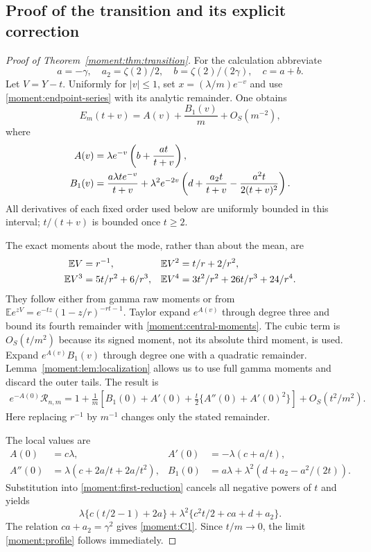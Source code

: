 \subsection{Proof of the transition and its explicit correction}
\begin{proof}[Proof of Theorem~\ref{moment:thm:transition}]
For the calculation abbreviate
\[
 a=-\gamma,\quad a_2=\zeta(2)/2,\quad b=\zeta(2)/(2\gamma),
 \quad c=a+b.
\]
Let $V=Y-t$. Uniformly for $|v|\le1$, set
$x=(\lambda/m)e^{-v}$ and use \eqref{moment:endpoint-series} with its
analytic remainder. One obtains
\begin{equation}\label{moment:local-expansion}
 E_m(t+v)=A(v)+\frac{B_1(v)}m+O_S(m^{-2}),
\end{equation}
where
\begin{align}\label{moment:local-functions}
 A(v)&=\lambda e^{-v}\left(b+\frac{at}{t+v}\right),\notag\\
 B_1(v)&=\frac{a\lambda te^{-v}}{t+v}
 +\lambda^2e^{-2v}\left(d+\frac{a_2t}{t+v}
                            -\frac{a^2t}{2(t+v)^2}\right).
\end{align}
All derivatives of each fixed order used below are uniformly bounded
in this interval; $t/(t+v)$ is bounded once $t\ge2$.

The exact moments about the mode, rather than about the mean, are
\begin{align}\label{moment:central-moments}
 \mathbb EV&=r^{-1},&
 \mathbb EV^2&=t/r+2/r^2,\notag\\
 \mathbb EV^3&=5t/r^2+6/r^3,&
 \mathbb EV^4&=3t^2/r^2+26t/r^3+24/r^4.
\end{align}
They follow either from gamma raw moments or from
$\mathbb Ee^{zV}=e^{-tz}(1-z/r)^{-rt-1}$.
Taylor expand $e^{A(v)}$ through degree three and bound its fourth
remainder with \eqref{moment:central-moments}. The cubic term is
$O_S(t/m^2)$ because its signed moment, not its absolute third moment,
is used. Expand $e^{A(v)}B_1(v)$ through degree one with a quadratic
remainder. Lemma~\ref{moment:lem:localization} allows us to use full
gamma moments and discard the outer tails. The result is
\begin{align}\label{moment:first-reduction}
 e^{-A(0)}\mathcal R_{n,m}
 =1+\frac1m\left[B_1(0)+A'(0)
       +\frac t2\{A''(0)+A'(0)^2\}\right]
 +O_S(t^2/m^2).
\end{align}
Here replacing $r^{-1}$ by $m^{-1}$ changes only the stated remainder.

The local values are
\begin{align*}
 A(0)&=c\lambda,& A'(0)&=-\lambda(c+a/t),\\
 A''(0)&=\lambda(c+2a/t+2a/t^2),&
 B_1(0)&=a\lambda+\lambda^2(d+a_2-a^2/(2t)).
\end{align*}
Substitution into \eqref{moment:first-reduction} cancels all negative
powers of $t$ and yields
\[
 \lambda\{c(t/2-1)+2a\}
 +\lambda^2\{c^2t/2+ca+d+a_2\}.
\]
The relation $ca+a_2=\gamma^2$ gives \eqref{moment:C1}.
Since $t/m\to0$, the limit \eqref{moment:profile} follows immediately.
\end{proof}

